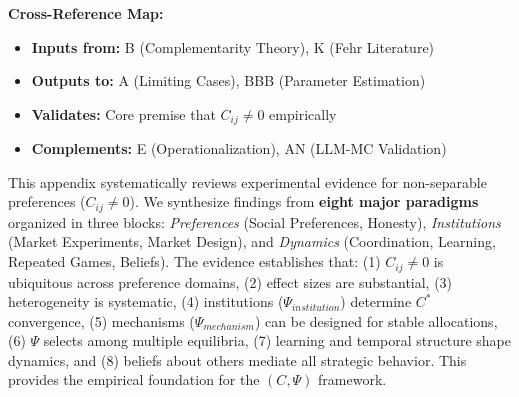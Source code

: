 
\noindent\textbf{Cross-Reference Map:}
\begin{itemize}[nosep]
    \item \textbf{Inputs from:} B (Complementarity Theory), K (Fehr Literature)
    \item \textbf{Outputs to:} A (Limiting Cases), BBB (Parameter Estimation)
    \item \textbf{Validates:} Core premise that $C_{ij} \neq 0$ empirically
    \item \textbf{Complements:} E (Operationalization), AN (LLM-MC Validation)
\end{itemize}


\begin{tcolorbox}[colback=green!5!white, colframe=green!75!black,
    title=\textbf{Abstract}]

This appendix systematically reviews experimental evidence for non-separable
preferences ($C_{ij} \neq 0$). We synthesize findings from \textbf{eight major paradigms}
organized in three blocks: \emph{Preferences} (Social Preferences, Honesty),
\emph{Institutions} (Market Experiments, Market Design), and \emph{Dynamics}
(Coordination, Learning, Repeated Games, Beliefs). The evidence establishes that:
(1) $C_{ij} \neq 0$ is ubiquitous across preference domains,
(2) effect sizes are substantial,
(3) heterogeneity is systematic,
(4) institutions ($\Psi_{institution}$) determine $C^*$ convergence,
(5) mechanisms ($\Psi_{mechanism}$) can be designed for stable allocations,
(6) $\Psi$ selects among multiple equilibria,
(7) learning and temporal structure shape dynamics, and
(8) beliefs about others mediate all strategic behavior.
This provides the empirical foundation for the $(C, \Psi)$ framework.

\end{tcolorbox}


